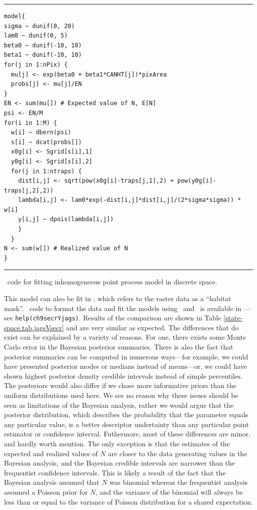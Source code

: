 \begin{panel}%
\centering
\rule[0.15in]{\textwidth}{.03in}
\begin{small}
\begin{verbatim}
model{
sigma ~ dunif(0, 20)
lam0 ~ dunif(0, 5)
beta0 ~ dunif(-10, 10)
beta1 ~ dunif(-10, 10)
for(j in 1:nPix) {
  mu[j] <- exp(beta0 + beta1*CANHT[j])*pixArea
  probs[j] <- mu[j]/EN
}
EN <- sum(mu[]) # Expected value of N, E[N]
psi <- EN/M
for(i in 1:M) {
  w[i] ~ dbern(psi)
  s[i] ~ dcat(probs[])
  x0g[i] <- Sgrid[s[i],1]
  y0g[i] <- Sgrid[s[i],2]
  for(j in 1:ntraps) {
    dist[i,j] <- sqrt(pow(x0g[i]-traps[j,1],2) + pow(y0g[i]-traps[j,2],2))
    lambda[i,j] <- lam0*exp(-dist[i,j]*dist[i,j]/(2*sigma*sigma)) * w[i]
    y[i,j] ~ dpois(lambda[i,j])
    }
  }
N <- sum(w[]) # Realized value of N
}
\end{verbatim}
\end{small}
\rule[0.15in]{\textwidth}{.03in}
\caption{\bugs~code for fitting inhomogeneous point process model in
  discrete space.}
\label{ch9.panel1}
\end{panel}

This model can also be fit in \secr, which refers
to the raster data as a ``habitat mask''. \R~code to format the data
and fit the models using \secr~and \jags~is available in \scrbook---see
\verb#help(ch9secrYjags)#. Results of the
comparison are shown in Table \ref{state-space.tab.jagsVsecr} and are
very similar as expected. The differences that do exist can be
explained by a variety of reasons. For one, there exists some Monte
Carlo error in the Bayesian posterior summaries. There is also the
fact that posterior summaries can be computed in numerous ways---for
example, we could have presented posterior modes or medians instead of
means---or, we could have shown highest posterior density credible
intervals instead of simple percentiles. The posteriors would also
differ if we chose more informative priors than the uniform
distributions used here. We see no reason why these
issues should be seen as limitations of the Bayesian analysis, rather
we would argue that the posterior distribution, which describes the
probability that the parameter equals any particular value, is a
better descriptor undertainty than any particular point estimator or
confidence interval. Futhermore, most of these differences are minor,
and hardly worth mention. The only exception is that the estimates of
the expected and realized values of $N$ are closer to the data
generating values in the Bayesian analysis, and the Bayesian credible
intervals are narrower than the frequentist confidence intervals. This
is likely a result of the fact that the Bayesian analysis assumed
that $N$ was binomial whereas the frequentist analysis
assumed a Poisson prior for $N$, and the variance of the binomial will
always be less than or equal to the variance of Poisson distribution
for a shared expectation.

